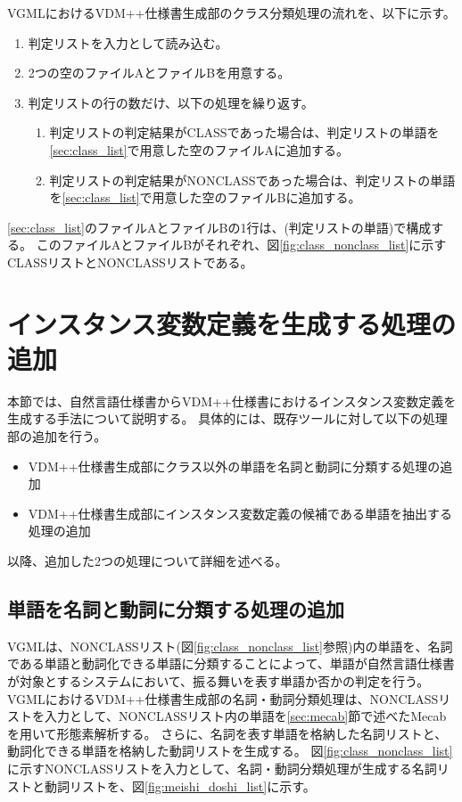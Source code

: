 VGMLにおけるVDM++仕様書生成部のクラス分類処理の流れを、以下に示す。

\begin{enumerate}
    \item 判定リストを入力として読み込む。
    \item 2つの空のファイルAとファイルBを用意する。
    \label{sec:class_list}
    \item 判定リストの行の数だけ、以下の処理を繰り返す。
        \begin{enumerate}
            \item 判定リストの判定結果がCLASSであった場合は、判定リストの単語を\ref{sec:class_list}で用意した空のファイルAに追加する。
            \item 判定リストの判定結果がNONCLASSであった場合は、判定リストの単語を\ref{sec:class_list}で用意した空のファイルBに追加する。
        \end{enumerate}
\end{enumerate}

\ref{sec:class_list}のファイルAとファイルBの1行は、(判定リストの単語)で構成する。
このファイルAとファイルBがそれぞれ、図\ref{fig:class_nonclass_list}に示すCLASSリストとNONCLASSリストである。

\section{インスタンス変数定義を生成する処理の追加}
\label{sec:instance_generate}
本節では、自然言語仕様書からVDM++仕様書におけるインスタンス変数定義を生成する手法について説明する。
具体的には、既存ツールに対して以下の処理部の追加を行う。

\begin{itemize}
    \item VDM++仕様書生成部にクラス以外の単語を名詞と動詞に分類する処理の追加
    \item VDM++仕様書生成部にインスタンス変数定義の候補である単語を抽出する処理の追加
\end{itemize}

以降、追加した2つの処理について詳細を述べる。

\subsection{単語を名詞と動詞に分類する処理の追加}
\label{sec:classifier_meishi}
VGMLは、NONCLASSリスト(図\ref{fig:class_nonclass_list}参照)内の単語を、名詞である単語と動詞化できる単語に分類することによって、単語が自然言語仕様書が対象とするシステムにおいて、振る舞いを表す単語か否かの判定を行う。
VGMLにおけるVDM++仕様書生成部の名詞・動詞分類処理は、NONCLASSリストを入力として、NONCLASSリスト内の単語を\ref{sec:mecab}節で述べたMecabを用いて形態素解析する。
さらに、名詞を表す単語を格納した名詞リストと、動詞化できる単語を格納した動詞リストを生成する。
図\ref{fig:class_nonclass_list}に示すNONCLASSリストを入力として、名詞・動詞分類処理が生成する名詞リストと動詞リストを、図\ref{fig:meishi_doshi_list}に示す。

